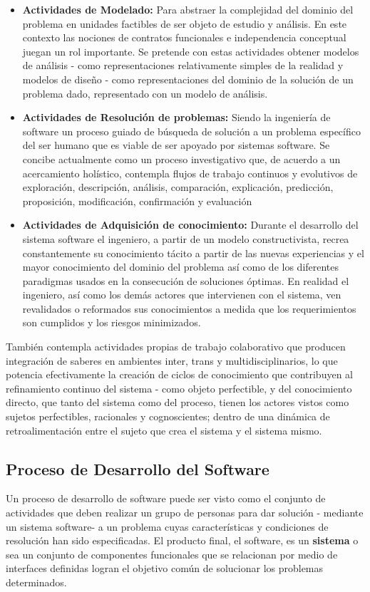 \begin{itemize}
\item \textbf{Actividades de Modelado:} Para abstraer la complejidad del dominio del problema en unidades factibles de ser objeto de estudio y análisis. En este contexto las nociones de contratos funcionales e independencia conceptual juegan un rol importante. Se pretende con estas actividades obtener modelos de análisis - como representaciones relativamente simples de la realidad y modelos de diseño - como representaciones del dominio de la solución de un problema dado, representado con un modelo de análisis. 
\item \textbf{Actividades de Resolución de problemas:} Siendo la ingeniería de software un proceso guiado de búsqueda de solución a un problema específico del ser humano que es viable de ser apoyado por sistemas software. Se concibe actualmente como un proceso investigativo que, de acuerdo a un acercamiento holístico, contempla flujos de trabajo continuos y evolutivos de exploración, descripción, análisis, comparación, explicación, predicción, proposición, modificación, confirmación y evaluación 
\item \textbf{Actividades de Adquisición de conocimiento:} Durante el desarrollo del sistema software el ingeniero, a partir de un modelo constructivista, recrea constantemente su conocimiento tácito a partir de las nuevas experiencias y el mayor conocimiento del dominio del problema así como de los diferentes paradigmas usados en la consecución de soluciones óptimas. En realidad el ingeniero, así como los demás actores que intervienen con el sistema, ven revalidados o reformados sus conocimientos a medida que los requerimientos son cumplidos y los riesgos minimizados.
\end{itemize}

También contempla actividades propias de trabajo colaborativo que producen integración de saberes en ambientes inter, trans y multidisciplinarios, lo que potencia efectivamente la creación de ciclos de conocimiento que contribuyen al refinamiento continuo del sistema - como objeto perfectible, y del conocimiento directo, que tanto del sistema como del proceso, tienen los actores vistos como sujetos perfectibles, racionales y cognoscientes; dentro de una dinámica de retroalimentación entre el sujeto que crea el sistema y el sistema mismo.

\subsection{Proceso de Desarrollo del Software}
Un proceso de desarrollo de software puede ser visto como el conjunto de actividades que deben realizar un grupo de personas para dar solución - mediante un sistema software- a un problema cuyas características y condiciones de resolución han sido especificadas. El producto final, el software, es un \textbf{sistema} o sea un conjunto de componentes funcionales que se relacionan por medio de interfaces definidas logran el objetivo común de solucionar los problemas determinados. 

